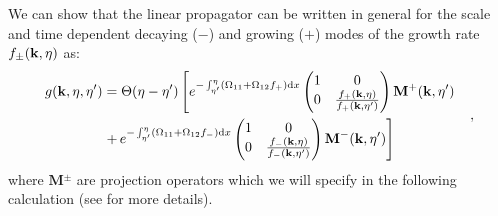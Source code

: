 We can show that the linear propagator can be written in general for the scale and time 
dependent decaying ($-$) and growing ($+$) modes of the growth rate $f_{\pm}(\mathbf{k},\eta)$ as:
\begin{equation}
\begin{aligned}g(\mathbf{k},\eta,\eta') & =\Theta(\eta-\eta')\left[e^{-\int_{\eta'}^{\eta}(\Omega_{11}+\Omega_{12}f_{+})\mathrm{d} x}\begin{pmatrix}1 & 0\\
0 & \frac{f_{+}(\mathbf{k},\eta)}{f_{+}(\mathbf{k},\eta')}
\end{pmatrix}\mathrm{\mathbf{M}}{}^{+}(\mathbf{k},\eta')\right.\\
& \left.+\, e^{-\int_{\eta'}^{\eta}(\Omega_{11}+\Omega_{12}f_{-})\mathrm{d} x}\begin{pmatrix}1 & 0\\
0 & \frac{f_{-}(\mathbf{k},\eta)}{f_{-}(\mathbf{k},\eta')}
\end{pmatrix}\mathrm{\mathbf{M}}{}^{-}(\mathbf{k},\eta')\right]
\end{aligned} \quad ,
\label{eq:general-propagator}
\end{equation}
where $\mathbf{M}{^\pm}$ are projection operators which we will specify in the following
calculation (see \cite{pietroni_flowing_2008} for more details).

